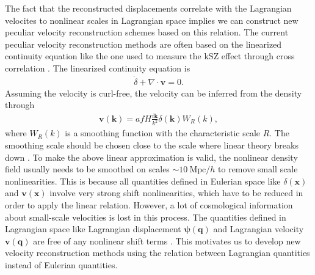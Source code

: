 \documentclass[aps,prx,twocolumn,superscriptaddress,groupedaddress,nofootinbib,amsfont]{revtex4}  %
\newcommand{\mr}{\mathrm}
\newcommand{\bea}{\begin{eqnarray}}
\newcommand{\eea}{\end{eqnarray}}
\newcommand{\bmp}{\bm{\psi}}
\newcommand{\bmv}{\bm{v}}
\newcommand{\bmk}{\bm{k}}
\newcommand{\bmx}{\bm{x}}
\newcommand{\bmq}{\bm{q}}
\begin{document}
The fact that the reconstructed displacements correlate with the Lagrangian 
velocites to nonlinear scales in Lagrangian space implies we can construct
new peculiar velocity reconstruction schemes based on this relation.
The current peculiar velocity reconstruction methods are often based on the 
linearized continuity equation like the one used to measure the kSZ effect 
through cross correlation \cite{2016PVR}. 
The linearized continuity equation is 
\bea
\dot{\delta}+\nabla\cdot\bmv=0.
\eea
Assuming the velocity is curl-free, the velocity can be inferred from the 
density through
\bea
\bmv(\bmk)=afH\frac{i\bmk}{k^2}\delta(\bmk)W_R(k),
\eea
where $W_R(k)$ is a smoothing function with the characteristic scale $R$.
The smoothing scale should be chosen close to the scale where linear theory 
breaks down \cite{2015marcel,2015BAOsm,2016Seo}. 
To make the above linear approximation is valid, the nonlinear density field 
usually needs to be smoothed on scales $\sim10\ \mr{Mpc}/h$ to remove small
scale nonlinearities. This is because all quantities defined in Eulerian space
like $\delta(\bmx)$ and $\bmv(\bmx)$ involve very strong shift nonlinearities,
which have to be reduced in order to apply the linear relation. 
However, a lot of cosmological information about small-scale velocities is lost 
in this process. The quantities defined in Lagrangian space like Lagrangian 
displacement $\bmp(\bmq)$ and Lagrangian velocity $\bmv(\bmq)$ are free of any
nonlinear shift terms \cite{2016BSZ}.
This motivates us to develop new velocity reconstruction methods using the 
relation between Lagrangian quantities instead of Eulerian quantities.
\end{document}

